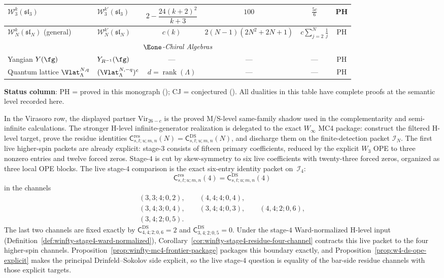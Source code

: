 \begin{table}[ht]
{{\begin{tabular}{|l|l|c|c|c|c|}
\hline
$\mathcal{W}_3^k(\mathfrak{sl}_3)$
  & $\mathcal{W}_3^{k'}(\mathfrak{sl}_3)$
  & $2 - \dfrac{24(k{+}2)^2}{k{+}3}$ & $100$ & $\tfrac{5c}{6}$ & PH \\[4pt]
\hline
$\mathcal{W}_N^k(\mathfrak{sl}_N)$ (general)
  & $\mathcal{W}_N^{k'}(\mathfrak{sl}_N)$
  & $c(k)$ & $2(N{-}1)(2N^2{+}2N{+}1)$
  & $c \displaystyle\sum_{j=2}^{N}\tfrac{1}{j}$ & PH \\[6pt]
\hline
\multicolumn{6}{|c|}{\textit{$\Eone$-Chiral Algebras}} \\
\hline
Yangian $Y(\fg)$
  & $Y_{R^{-1}}(\fg)$
  & --- & --- & --- & PH \\
\hline
Quantum lattice $\Vlat_\Lambda^{N,q}$
  & $(\Vlat_\Lambda^{N,-q})^c$
  & $d = \operatorname{rank}(\Lambda)$ & ---
  & --- & PH \\
\hline
\end{tabular}%
}%
}%
\end{table}

\noindent\textbf{Status column}: PH = proved in this monograph
(\ClaimStatusProvedHere); CJ = conjectured (\ClaimStatusConjectured).
All dualities in this table have complete proofs at the semantic level
recorded here.

In the Virasoro row, the displayed partner $\mathrm{Vir}_{26-c}$ is
the proved M/S-level same-family shadow used in the complementarity
and semi-infinite calculations.  The stronger H-level
infinite-generator realization is delegated to the exact
$W_\infty$ MC4 package: construct the filtered H-level target, prove
the residue identities
$\mathsf{C}^{\mathrm{res}}_{s,t;u;m,n}(N)
=\mathsf{C}^{\mathrm{DS}}_{s,t;u;m,n}(N)$,
and discharge them on the finite-detection packet $\mathcal{I}_N$.
The first live higher-spin packets are already explicit: stage-$3$
consists of fifteen primary coefficients, reduced by the explicit
$W_3$ OPE to three nonzero entries and twelve forced zeros.  Stage-$4$
is cut by skew-symmetry to six live coefficients with twenty-three
forced zeros, organized as three local OPE blocks.  The live
stage-$4$ comparison is the exact six-entry identity packet
on~$\mathcal{I}_4$:
\[
\mathsf{C}^{\mathrm{res}}_{s,t;u;m,n}(4)
=
\mathsf{C}^{\mathrm{DS}}_{s,t;u;m,n}(4)
\]
in the channels
\[
\begin{gathered}
(3,3;4;0,2),\qquad
(4,4;4;0,4),\\
(3,4;3;0,4),\qquad
(3,4;4;0,3),\qquad
(4,4;2;0,6),\\
(3,4;2;0,5).
\end{gathered}
\]
The last two channels are fixed exactly by
$\mathsf{C}^{\mathrm{DS}}_{4,4;2;0,6}=2$ and
$\mathsf{C}^{\mathrm{DS}}_{3,4;2;0,5}=0$.
Under the stage-$4$ Ward-normalized H-level input
(Definition~\ref{def:winfty-stage4-ward-normalized}),
Corollary~\ref{cor:winfty-stage4-residue-four-channel} contracts this
live packet to the four higher-spin channels.
Proposition~\ref{prop:winfty-mc4-frontier-package} packages this
boundary exactly, and
Proposition~\ref{prop:w4-ds-ope-explicit} makes the principal
Drinfeld--Sokolov side explicit, so the live stage-$4$ question is
equality of the bar-side residue channels with those explicit targets.

